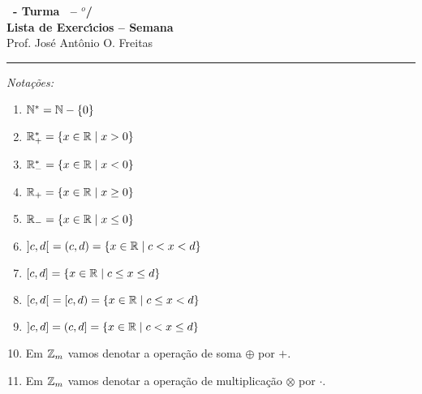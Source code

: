 \documentclass[12pt]{exam}
\begin{document}
    \begin{center}
        {\Large\bf \disciplina\ - Turma \turma\ -- \semestre$^{o}$/\ano} \\ \vspace{9pt} {\large\bf
            Lista de Exerc{\'\i}cios -- Semana \numerosemana}\\ \vspace{9pt} Prof. Jos{\'e} Ant{\^o}nio O. Freitas
    \end{center}
    \hrule

    \vspace{.6cm}

    \begin{center}
        \textit{Nota\c{c}\~oes:}
    \end{center}

    \begin{multicols}{2}
        \begin{enumerate}[label={\roman*})]
            \item $\mathbb{N}^* = \mathbb{N} - \{0\}$

            \item $\mathbb{R}^*_+ = \{x \in \mathbb{R} \mid x > 0\}$

            \item $\mathbb{R}^*_- = \{x \in \mathbb{R} \mid x < 0\}$

            \item $\mathbb{R}_+ = \{x \in \mathbb{R} \mid x \ge 0\}$

            \item $\mathbb{R}_- = \{x \in \mathbb{R} \mid x \le 0\}$

            \item $]c,d[\ = (c,d) = \{x \in \mathbb{R} \mid c < x < d\}$

            \item $[c,d] = \{x \in \mathbb{R} \mid c \le x \le d\}$

            \item $[c,d[\ = [c, d) = \{x \in \mathbb{R} \mid c \le x < d\}$

            \item $]c,d] = (c, d] = \{x \in \mathbb{R} \mid c < x \le d\}$

            \item Em $\mathbb{Z}_m$ vamos denotar a opera\c{c}\~ao de soma $\oplus$ por $+$.

            \item Em $\mathbb{Z}_m$ vamos denotar a opera\c{c}\~ao de multiplica\c{c}\~ao $\otimes$ por $\cdot$.
        \end{enumerate}
    \end{multicols}
\end{document}
